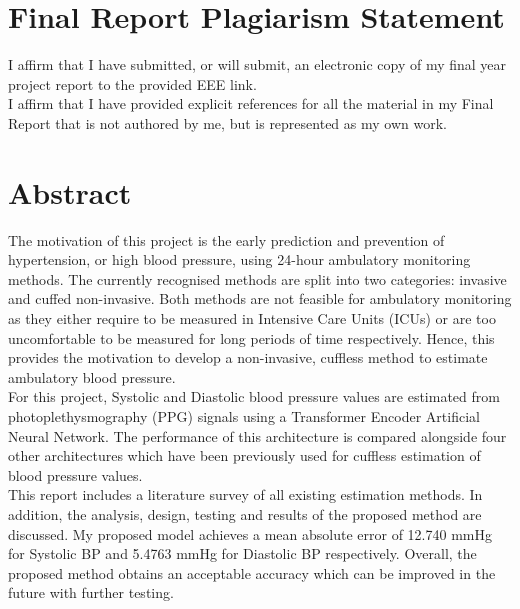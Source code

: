 \section*{Final Report Plagiarism Statement}
I affirm that I have submitted, or will submit, an electronic copy of 
my final year project report to the provided EEE link.\\ \newline \noindent I affirm 
that I have provided explicit references for all the material in my Final Report that 
is not authored by me, but is represented as my own work.

\newpage


\section*{Abstract}
The motivation of this project is the early prediction and prevention of hypertension, or high blood pressure, using 24-hour ambulatory monitoring methods. The currently recognised methods are split into 
two categories: invasive and cuffed non-invasive. Both methods are not feasible for ambulatory monitoring as they either require to be measured in Intensive Care Units (ICUs) or are 
too uncomfortable to be measured for long periods of time respectively. Hence, this provides the motivation to develop a non-invasive, cuffless method to estimate ambulatory blood pressure.\\ \newline \noindent For this project, Systolic and Diastolic blood pressure values are estimated from photoplethysmography (PPG) signals using a Transformer Encoder Artificial Neural Network. 
The performance of this architecture is compared alongside four other architectures which have been previously used for cuffless estimation of blood pressure values. \\ \newline \noindent This report includes a literature survey of all existing estimation methods. In addition, the analysis, design, testing and results of the proposed method are discussed. My proposed model achieves a mean absolute error of 12.740 mmHg for Systolic BP and 5.4763 mmHg for Diastolic BP respectively. 
Overall, the proposed method obtains an acceptable accuracy which can be improved in the future with further testing.